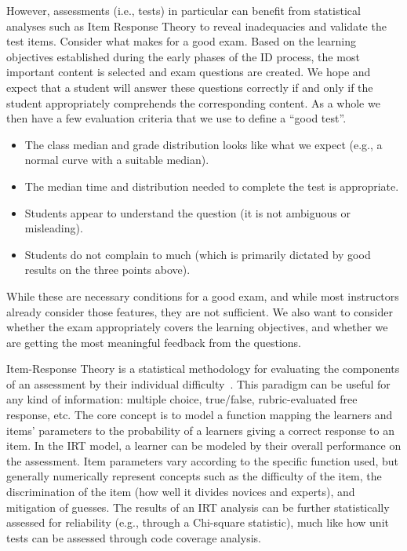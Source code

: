 However, assessments (i.e., tests) in particular can benefit from statistical analyses such as Item Response Theory to reveal inadequacies and validate the test items.
Consider what makes for a good exam.
Based on the learning objectives established during the early phases of the ID process, the most important content is selected and exam questions are created.
We hope and expect that a student will answer these questions correctly if and only if the student appropriately comprehends the corresponding content.
As a whole we then have a few evaluation criteria that we use to define a ``good test''.
\begin{itemize}
\item The class median and grade distribution looks like what we expect (e.g., a normal curve with a suitable median).
\item The median time and distribution needed to complete the test is appropriate.
\item Students appear to understand the question (it is not ambiguous or misleading).
\item Students do not complain to much (which is primarily dictated by good results on the three points above).
\end{itemize}

While these are necessary conditions for a good exam, and while most instructors already consider those features, they are not sufficient.
We also want to consider whether the exam appropriately covers the learning objectives, and whether we are getting the most meaningful feedback from the questions.

Item-Response Theory is a statistical methodology for evaluating the components of an assessment by their individual difficulty~\citep{van2013handbook,Sudol-itr}.
This paradigm can be useful for any kind of information: multiple choice, true/false, rubric-evaluated free response, etc.
The core concept is to model a function mapping the learners and items' parameters to the probability of a learners giving a correct response to an item.
In the IRT model, a learner can be modeled by their overall performance on the assessment.
Item parameters vary according to the specific function used, but generally numerically represent concepts such as the difficulty of the item, the discrimination of the item (how well it divides novices and experts), and mitigation of guesses.
The results of an IRT analysis can be further statistically assessed for reliability (e.g., through a Chi-square statistic), much like how unit tests can be assessed through code coverage analysis.

